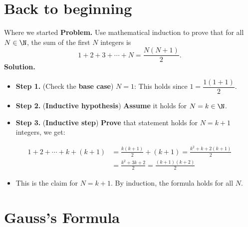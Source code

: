\documentclass[11pt,aspectratio=1610,handout]{beamer}
\begin{document}
\section{Back to beginning}

	\begin{frame}{Where we started} \p
		\textbf{Problem.} Use mathematical induction to prove that for all $N \in \N$, the sum of the first $N$ integers is
		\[
		1 + 2 + 3 + \cdots + N = \frac{N(N+1)}{2}.
		\] \p
		\textbf{Solution.}\p
		\begin{itemize}
			\item \textbf{Step 1.} (Check the \textbf{base case}) $N = 1$: This holds since $1 = \dfrac{1(1+1)}{2}$. \p
			\item \textbf{Step 2.} (\textbf{Inductive hypothesis}) \textbf{Assume} it holds for $N = k\in \N$. \p
			\item \textbf{Step 3.} (\textbf{Inductive step})	\textbf{Prove} that statement holds for $N=k+1$ integers, \p we get: 
		\end{itemize}
		\begin{align*}
		1 + 2 + \cdots + k + (k+1) 
		&= \frac{k(k+1)}{2} + (k+1) = \frac{k^2 + k + 2(k+1)}{2} \\ 
		&= \frac{k^2 + 3k + 2}{2}= \frac{(k+1)(k+2)}{2}
		\end{align*}\p
		\begin{itemize}
			\item This is the claim for $N=k+1$. By induction, the formula holds for all $N$. 
		\end{itemize}
	\end{frame}


\section{Gauss's Formula}
\end{document}
